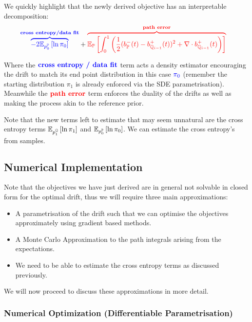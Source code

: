 \documentclass[a4paper,12pt,twoside,openright]{report}
\makeatletter
\theoremstyle{definition}
\def\mathcolor#1#{\@mathcolor{#1}}
\def\@mathcolor#1#2#3{%
  \protect\leavevmode
  \begingroup
    \color#1{#2}#3%
  \endgroup
}
\makeatother
\begin{document}
We quickly highlight that the newly derived objective has an interpretable  decomposition:
\begin{align*}
 \mathcolor{blue}{\overbrace{-2\E_{p^{\P}_0}\left[\log \pi_0 \right]}^{\textbf{cross entropy/data fit}}} &+ \mathcolor{red}{\overbrace{\E_{\P}\left[\int_0^1 \left(\frac{1}{2}(b_\P^{-}(t) - b_{\Q_{i-1}}^{+}(t))^2 + \nabla\cdot b^{+}_{\Q_{i-1}}(t) \right)\right] }^{\textbf{path error}}}
\end{align*}

Where the $\mathcolor{blue}{\textbf{cross entropy / data fit}}$ term acts a density estimator encouraging the drift to match its end point distribution in this case $\mathcolor{blue}{\pi_0}$ (remember the starting distribution $\pi_1$ is already enforced via the SDE parametrisation). Meanwhile the $\mathcolor{red}{\textbf{path error}}$ term enforces the duality of the drifts as well as making the process akin to the reference prior.

Note that the  new terms left to estimate that may seem unnatural are the cross entropy terms $\mathbb{E}_{p^{{\mathbb{Q}}}_1}\left[\operatorname{ln} \pi_1 \right]$ and $\mathbb{E}_{p^{{\mathbb{P}}}_0}\left[\operatorname{ln} \pi_0 \right]$. We can estimate the cross entropy's from samples. 

\subsection{Numerical Implementation}

Note that the objectives we have just derived are in general not solvable in closed form for the optimal drift, thus we will require three main approximations:
\begin{itemize}
    \item A parametrisation of the drift such that we can optimise the objectives approximately using gradient based methods.
    \item A Monte Carlo Approximation to the path integrals arising from the expectations.
    \item We need to be able to estimate the cross entropy terms as discussed previously.
\end{itemize}

We will now proceed to discuss these approximations in more detail.
\subsubsection{Numerical Optimization (Differentiable Parametrisation)}
\end{document}
